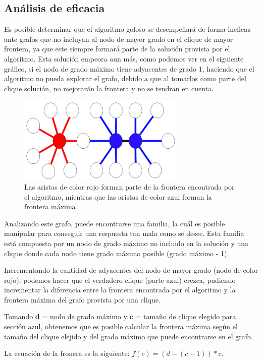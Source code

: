 \documentclass[a4paper, 10pt, twoside]{article}
\begin{document}
\subsection{Análisis de eficacia}
Es posible determinar que el algoritmo goloso se desempeñará de forma ineficaz ante grafos que no incluyan al nodo de mayor grado en el clique de mayor frontera, ya que este siempre formará parte de la solución provista por el algoritmo. Esta solución empeora aun más, como podemos ver en el siguiente gráfico, si el nodo de grado máximo tiene adyacentes de grado 1, haciendo que el algoritmo no pueda explorar el grafo, debido a que al tomarlos como parte del clique solución, no mejorarán la frontera y no se tendran en cuenta.

\begin{figure}[H]
\centering
\includegraphics[width=80mm]{ejemploErrorGoloso.png}
\caption{Las aristas de color rojo forman parte de la frontera encontrada por el algoritmo, mientras que las aristas de color azul forman la frontera máxima}
\label{overflow}
\end{figure}

Analizando este grafo, puede encontrarse una familia, la cuál es posible manipular para conseguir una respuesta tan mala como se desee. Esta familia está compuesta por un nodo de grado máximo no incluido en la solución y una clique donde cada nodo tiene grado máximo posible (grado máximo - 1).

Incrementando la cantidad de adyacentes del nodo de mayor grado (nodo de color rojo), podemos hacer que el verdadero clique (parte azul) crezca, pudiendo incrementar la diferencia entre la frontera encontrada por el algoritmo y la frontera máxima del grafo provista por una clique.

Tomando \textbf{d} = nodo de grado máximo y \textbf{c} = tamaño de clique elegido para sección azul, obtenemos que es posible calcular la frontera máxima según el tamaño del clique elejido y del grado máximo que puede encontrarse en el grafo.

La ecuación de la fronera es la siguiente: $f(c) = (d - (c - 1)) * c$.
\end{document}
